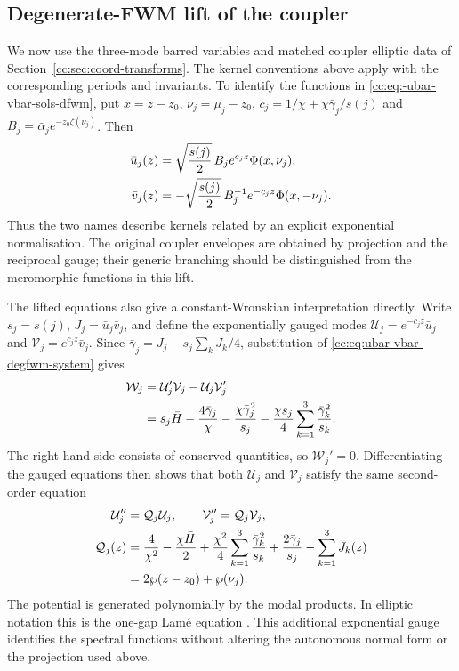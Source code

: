 \documentclass[11pt,a4paper]{article}
\numberwithin{equation}{section}
\begin{document}
\subsection{Degenerate-FWM lift of the coupler}
We now use the three-mode barred variables and matched coupler elliptic data of Section~\ref{cc:sec:coord-transforms}.
The kernel conventions above apply with the corresponding periods and invariants.
To identify the functions in \eqref{cc:eq:-ubar-vbar-sols-dfwm}, put $x=z-z_0$, $\nu_j=\mu_j-z_0$, $c_j=1/\chi+\chi\bar\gamma_j/s(j)$ and $B_j=\bar\alpha_j e^{-z_0\zeta(\nu_j)}$.
Then
\begin{align}
\bar u_j(z)&=\sqrt{\frac{s(j)}2}\,B_j e^{c_jz}\Phi(x,\nu_j),\notag\\
\bar v_j(z)&=-\sqrt{\frac{s(j)}2}\,B_j^{-1}e^{-c_jz}\Phi(x,-\nu_j).
\end{align}
Thus the two names describe kernels related by an explicit exponential normalisation.
The original coupler envelopes are obtained by projection and the reciprocal gauge; their generic branching should be distinguished from the meromorphic functions in this lift.

The lifted equations also give a constant-Wronskian interpretation directly.
Write $s_j=s(j)$, $J_j=\bar u_j\bar v_j$, and define the exponentially gauged modes $\mathcal U_j=e^{-c_jz}\bar u_j$ and $\mathcal V_j=e^{c_jz}\bar v_j$.
Since $\bar\gamma_j=J_j-s_j\sum_kJ_k/4$, substitution of \eqref{cc:eq:ubar-vbar-degfwm-system} gives
\begin{align}
\mathcal W_j&=\mathcal U_j'\mathcal V_j-\mathcal U_j\mathcal V_j'\notag\\
&=s_j\bar H-\frac{4\bar\gamma_j}{\chi}
-\frac{\chi\bar\gamma_j^2}{s_j}
-\frac{\chi s_j}{4}\sum_{k=1}^3\frac{\bar\gamma_k^2}{s_k}.
\label{cc:eq:lifted-wronskian}
\end{align}
The right-hand side consists of conserved quantities, so $\mathcal W_j'=0$.
Differentiating the gauged equations then shows that both $\mathcal U_j$ and $\mathcal V_j$ satisfy the same second-order equation
\begin{align}
\mathcal U_j''&=\mathcal Q_j\mathcal U_j,\qquad
\mathcal V_j''=\mathcal Q_j\mathcal V_j,\notag\\
\mathcal Q_j(z)&=\frac{4}{\chi^2}-\frac{\chi\bar H}{2}
+\frac{\chi^2}{4}\sum_{k=1}^3\frac{\bar\gamma_k^2}{s_k}
+\frac{2\bar\gamma_j}{s_j}-\sum_{k=1}^3J_k(z)\notag\\
&=2\wp(z-z_0)+\wp(\nu_j).
\label{cc:eq:lifted-lame}
\end{align}
The potential is generated polynomially by the modal products.
In elliptic notation this is the one-gap Lam\'e equation \cite[Eq.~(1.9)]{kricheverEllipticSolutionsNonlinear1994}.
This additional exponential gauge identifies the spectral functions without altering the autonomous normal form or the projection used above.
\end{document}
